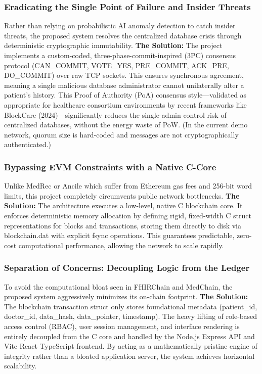 \documentclass[12pt]{article}
\begin{document}
\subsubsection{Eradicating the Single Point of Failure and Insider Threats}
Rather than relying on probabilistic AI anomaly detection to catch insider threats, the proposed system resolves the centralized database crisis through deterministic cryptographic immutability.
\textbf{The Solution:} The project implements a custom-coded, three-phase-commit-inspired (3PC) consensus protocol (CAN\_COMMIT, VOTE\_YES, PRE\_COMMIT, ACK\_PRE, DO\_COMMIT) over raw TCP sockets. This ensures synchronous agreement, meaning a single malicious database administrator cannot unilaterally alter a patient's history. This Proof of Authority (PoA) consensus style—validated as appropriate for healthcare consortium environments by recent frameworks like BlockCare (2024)—significantly reduces the single-admin control risk of centralized databases, without the energy waste of PoW. (In the current demo network, quorum size is hard-coded and messages are not cryptographically authenticated.)

\subsubsection{Bypassing EVM Constraints with a Native C-Core}
Unlike MedRec or Ancile which suffer from Ethereum gas fees and 256-bit word limits, this project completely circumvents public network bottlenecks.
\textbf{The Solution:} The architecture executes a low-level, native C blockchain core. It enforces deterministic memory allocation by defining rigid, fixed-width C struct representations for blocks and transactions, storing them directly to disk via blockchain.dat with explicit fsync operations. This guarantees predictable, zero-cost computational performance, allowing the network to scale rapidly.

\subsubsection{Separation of Concerns: Decoupling Logic from the Ledger}
To avoid the computational bloat seen in FHIRChain and MedChain, the proposed system aggressively minimizes its on-chain footprint.
\textbf{The Solution:} The blockchain transaction struct only stores foundational metadata (patient\_id, doctor\_id, data\_hash, data\_pointer, timestamp). The heavy lifting of role-based access control (RBAC), user session management, and interface rendering is entirely decoupled from the C core and handled by the Node.js Express API and Vite React TypeScript frontend. By acting as a mathematically pristine engine of integrity rather than a bloated application server, the system achieves horizontal scalability.
\end{document}
